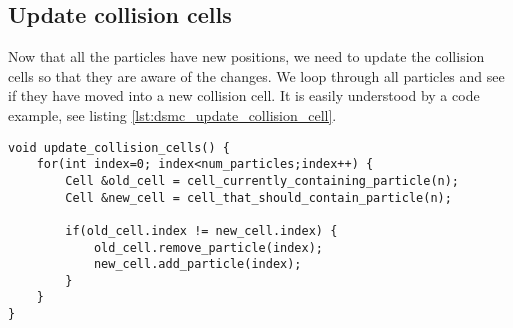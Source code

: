 \subsection{Update collision cells}
Now that all the particles have new positions, we need to update the collision cells so that they are aware of the changes. We loop through all particles and see if they have moved into a new collision cell. It is easily understood by a code example, see listing \ref{lst:dsmc_update_collision_cell}.
\begin{lstlisting}[caption=Updating the collision cell particle lists., label=lst:dsmc_update_collision_cell]
void update_collision_cells() {
	for(int index=0; index<num_particles;index++) {
	    Cell &old_cell = cell_currently_containing_particle(n);
	    Cell &new_cell = cell_that_should_contain_particle(n);

	    if(old_cell.index != new_cell.index) {
	        old_cell.remove_particle(index);
	        new_cell.add_particle(index);
	    }
	}
}
\end{lstlisting}

